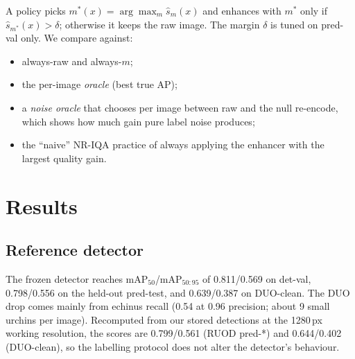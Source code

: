 \documentclass[conference]{IEEEtran}
\begin{document}
A policy picks $m^*(x)=\arg\max_m \hat{s}_m(x)$ and enhances with $m^*$ only if $\hat{s}_{m^*}(x)>\delta$; otherwise it keeps the raw image. The margin $\delta$ is tuned on pred-val only. We compare against:
\begin{itemize}
\item always-raw and always-$m$;
\item the per-image \emph{oracle} (best true AP);
\item a \emph{noise oracle} that chooses per image between raw and the null re-encode, which shows how much gain pure label noise produces;
\item the ``naive'' NR-IQA practice of always applying the enhancer with the largest quality gain.
\end{itemize}

\section{Results}
\subsection{Reference detector}
The frozen detector reaches mAP$_{50}$/mAP$_{50:95}$ of 0.811/0.569 on det-val, 0.798/0.556 on the held-out pred-test, and 0.639/0.387 on DUO-clean. The DUO drop comes mainly from echinus recall (0.54 at 0.96 precision; about 9 small urchins per image). Recomputed from our stored detections at the 1280\,px working resolution, the scores are 0.799/0.561 (RUOD pred-*) and 0.644/0.402 (DUO-clean), so the labelling protocol does not alter the detector's behaviour.
\end{document}
